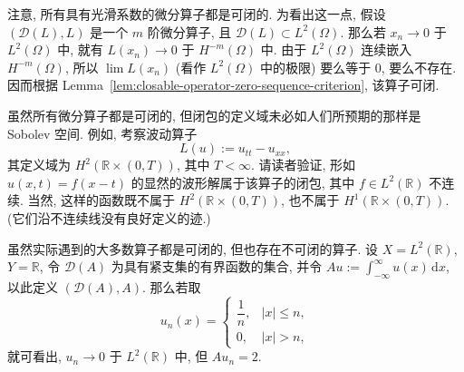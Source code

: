 \begin{Example}
\label{ex:differential-operators-closable-wave-domain}
注意, 所有具有光滑系数的微分算子都是可闭的. 为看出这一点, 假设 $(\mathcal{D}(L),L)$ 是一个 $m$ 阶微分算子, 且 $\mathcal{D}(L)\subset L^2(\Omega)$. 那么若 $x_n\to0$ 于 $L^2(\Omega)$ 中, 就有 $L(x_n)\to0$ 于 $H^{-m}(\Omega)$ 中. 由于 $L^2(\Omega)$ 连续嵌入 $H^{-m}(\Omega)$, 所以 $\lim L(x_n)$ (看作 $L^2(\Omega)$ 中的极限) 要么等于 $0$, 要么不存在. 因而根据 Lemma~\ref{lem:closable-operator-zero-sequence-criterion}, 该算子可闭.

虽然所有微分算子都是可闭的, 但闭包的定义域未必如人们所预期的那样是 Sobolev 空间. 例如, 考察波动算子
\begin{equation}\label{eq:wave-operator-closable-nonsobolev-example}
L(u):=u_{tt}-u_{xx},
\end{equation}
其定义域为 $H^2(\mathbb{R}\times(0,T))$, 其中 $T<\infty$. 请读者验证, 形如 $u(x,t)=f(x-t)$ 的显然的波形解属于该算子的闭包, 其中 $f\in L^2(\mathbb{R})$ 不连续. 当然, 这样的函数既不属于 $H^2(\mathbb{R}\times(0,T))$, 也不属于 $H^1(\mathbb{R}\times(0,T))$. (它们沿不连续线没有良好定义的迹.)
\end{Example}

\begin{Example}
\label{ex:nonclosable-integral-operator}
虽然实际遇到的大多数算子都是可闭的, 但也存在不可闭的算子. 设 $X=L^2(\mathbb{R})$, $Y=\mathbb{R}$, 令 $\mathcal{D}(A)$ 为具有紧支集的有界函数的集合, 并令 $Au:=\int_{-\infty}^\infty u(x)\,\mathrm{d}x$, 以此定义 $(\mathcal{D}(A),A)$. 那么若取
\begin{equation}\label{eq:nonclosable-integral-operator-sequence}
u_n(x)=\begin{cases}\dfrac{1}{n},&|x|\leq n,\\0,&|x|>n,\end{cases}
\end{equation}
就可看出, $u_n\to0$ 于 $L^2(\mathbb{R})$ 中, 但 $Au_n=2$.
\end{Example}
